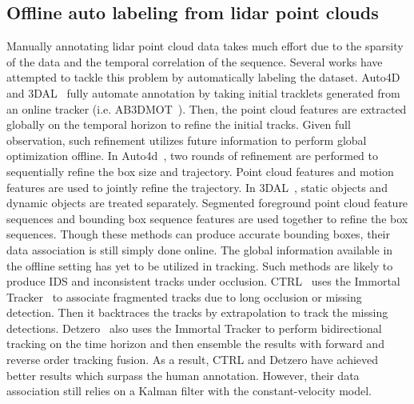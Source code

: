 \documentclass{article} \usepackage{iclr2023_conference,times}
\begin{document}
\subsection{Offline auto labeling from lidar point clouds}
\vspace{-1mm}
Manually annotating lidar point cloud data takes much effort due to the sparsity of the data and the temporal correlation of the sequence. Several works have attempted to tackle this problem by automatically labeling the dataset. Auto4D and 3DAL~\cite{Auto4d,offboard_labeling} fully automate annotation by taking initial tracklets generated from an online tracker (i.e. AB3DMOT~\cite{basline_with_AMOTA}). Then, the point cloud features are extracted globally on the temporal horizon to refine the initial tracks. Given full observation, such refinement utilizes future information to perform global optimization offline. In Auto4d~\cite{Auto4d}, two rounds of refinement are performed to sequentially refine the box size and trajectory. Point cloud features and motion features are used to jointly refine the trajectory. In 3DAL~\cite{offboard_labeling}, static objects and dynamic objects are treated separately. Segmented foreground point cloud feature sequences and bounding box sequence features are used together to refine the box sequences. Though these methods can produce accurate bounding boxes, their data association is still simply done online. The global information available in the offline setting has yet to be utilized in tracking. Such methods are likely to produce IDS and inconsistent tracks under occlusion. CTRL~\cite{CTRL} uses the Immortal Tracker~\cite{Immortaltrackers} to associate fragmented tracks due to long occlusion or missing detection. Then it backtraces the tracks by extrapolation to track the missing detections. Detzero~\cite{Detzero} also uses the Immortal Tracker to perform bidirectional tracking on the time horizon and then ensemble the results with forward and reverse order tracking fusion. As a result, CTRL and Detzero have achieved better results which surpass the human annotation. However, their data association still relies on a Kalman filter with the constant-velocity model.
\vspace{-1mm}
\end{document}
